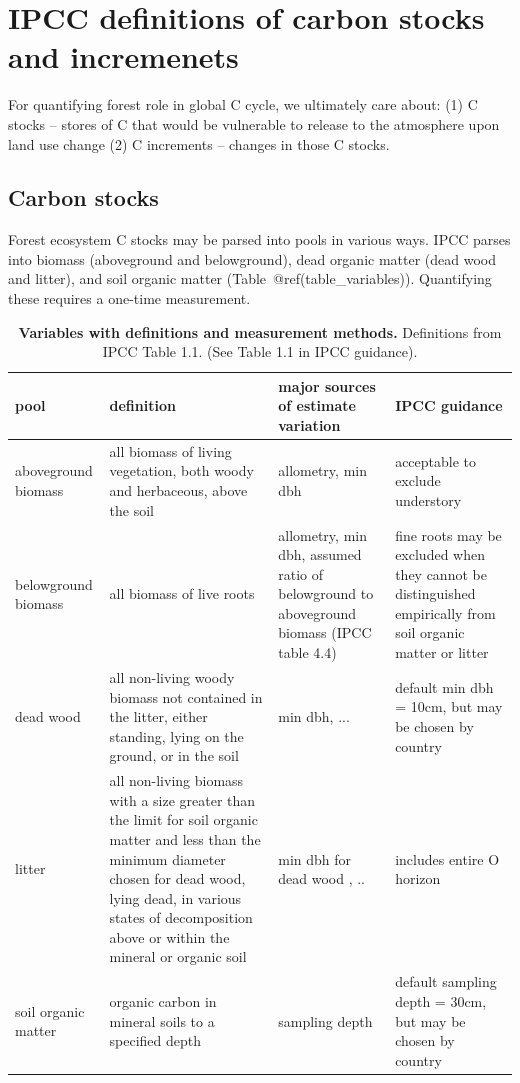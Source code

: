\documentclass[, manuscript]{copernicus}
\begin{document}
\section{IPCC definitions of carbon stocks and incremenets}

For quantifying forest role in global C cycle, we ultimately care about:
(1) C stocks -- stores of C that would be vulnerable to release to the
atmosphere upon land use change (2) C increments -- changes in those C
stocks.

\subsection{Carbon stocks}

Forest ecosystem C stocks may be parsed into pools in various ways. IPCC
parses into biomass (aboveground and belowground), dead organic matter
(dead wood and litter), and soil organic matter
(Table~@ref(table\_variables)). Quantifying these requires a one-time
measurement.

\begin{table}

\caption{\label{tab:table_variables}\textbf{Variables with definitions and measurement methods.} Definitions from IPCC Table 1.1. (See Table 1.1 in IPCC guidance).}
\centering
\begin{tabu} to 
\hline
\textbf{pool} & \textbf{definition} & \textbf{major sources of estimate variation} & \textbf{IPCC guidance}\\
\hline
aboveground biomass & all biomass of living vegetation, both woody and herbaceous, above the soil & allometry, min dbh & acceptable to exclude understory\\
\hline
belowground biomass & all biomass of live roots & allometry, min dbh, assumed ratio of belowground to aboveground biomass (IPCC table 4.4) & fine roots may be excluded when they cannot be distinguished empirically from soil organic matter or litter\\
\hline
dead wood & all non-living woody biomass not contained in the litter, either standing, lying on the ground, or in the soil & min dbh,  ... & default min dbh = 10cm, but may be chosen by country\\
\hline
litter & all non-living biomass with a size greater than the limit for soil organic matter  and less than the minimum diameter chosen for dead wood, lying dead, in various states of decomposition above or within the mineral or organic soil & min dbh for dead wood , .. & includes entire O horizon\\
\hline
soil organic matter & organic carbon in mineral soils to a specified depth & sampling depth & default sampling depth = 30cm, but may be chosen by country\\
\hline
\end{tabu}
\end{table}
\end{document}
